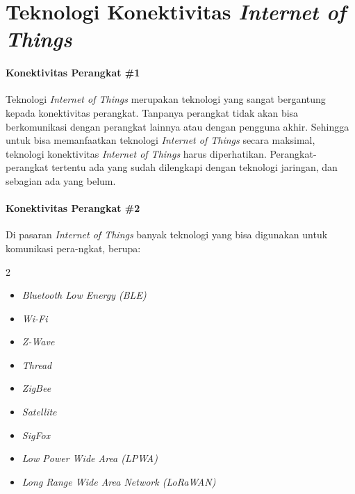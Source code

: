 

\section{Teknologi Konektivitas \textit{Internet of Things}}
\begin{frame}{\insertsectionhead}
	\framesubtitle{Konektivitas Perangkat \#1}
	\justifying
	Teknologi \textit{Internet of Things} merupakan teknologi yang sangat bergantung kepada konektivitas perangkat. Tanpanya perangkat tidak akan bisa berkomunikasi dengan perangkat lainnya atau dengan pengguna akhir.
	\vfill
	Sehingga untuk bisa memanfaatkan teknologi \textit{Internet of Things} secara maksimal, teknologi konektivitas \textit{Internet of Things} harus diperhatikan. Perangkat-perangkat tertentu ada yang sudah dilengkapi dengan teknologi jaringan, dan sebagian ada yang belum.
\end{frame}

\begin{frame}{\insertsectionhead}
	\framesubtitle{Konektivitas Perangkat \#2}
	\justifying
	Di pasaran \textit{Internet of Things} banyak teknologi yang bisa digunakan untuk komunikasi pera-ngkat, berupa:
	\begin{multicols}{2}
		\begin{itemize}
			\item \textit{Bluetooth Low Energy (BLE)} 
			\item \textit{Wi-Fi}
			\item \textit{Z-Wave}
			\item \textit{Thread}
			\item \textit{ZigBee}
			\item \textit{Satellite}
			\item \textit{SigFox}
			\item \textit{Low Power Wide Area (LPWA)}
			\item \textit{Long Range Wide Area Network (LoRaWAN)}
		\end{itemize}
	\end{multicols}
\end{frame}

